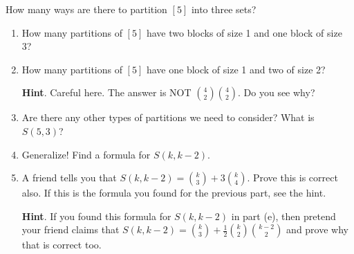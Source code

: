 \documentclass{book}
\begin{document}
\setcounter{cpjt}{274}
\addtocounter{cpjt}{-1}
\begin{activity}\label{activity-267}
\hypertarget{p-1401}{}%
How many ways are there to partition \([5]\) into three sets?%
\begin{enumerate}[font=\bfseries,label=(\alph*),ref=\alph*]
\item\label{task-254} \hypertarget{p-1402}{}%
How many partitions of \([5]\) have two blocks of size 1 and one block of size 3?%
\item\label{task-255} \hypertarget{p-1403}{}%
How many partitions of \([5]\) have one block of size 1 and two of size 2?%
\par\smallskip%
\noindent\textbf{Hint}.\hypertarget{hint-177}{}\quad%
\hypertarget{p-1404}{}%
Careful here.  The answer is NOT \(\binom{4}{2}\binom{4}{2}\).  Do you see why?%
\item\label{task-256} \hypertarget{p-1405}{}%
Are there any other types of partitions we need to consider?  What is \(S(5,3)\)?%
\item\label{task-257} \hypertarget{p-1406}{}%
Generalize! Find a formula for \(S(k, k-2)\).%
\item\label{task-258} \hypertarget{p-1407}{}%
A friend tells you that \(S(k,k-2) = \binom{k}{3} + 3 \binom{k}{4}\).  Prove this is correct also.  If this is the formula you found for the previous part, see the hint.%
\par\smallskip%
\noindent\textbf{Hint}.\hypertarget{hint-178}{}\quad%
\hypertarget{p-1408}{}%
If you found this formula for \(S(k,k-2)\) in part (e), then pretend your friend claims that \(S(k, k-2) = \binom{k}{3} + \frac{1}{2}\binom{k}{2}\binom{k-2}{2}\) and prove why that is correct too.%
\end{enumerate}
\end{activity}

\clearpage
\end{document}
